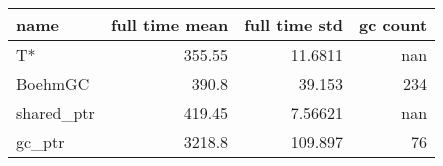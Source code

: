 \begin{tabular}{lrrr}
\hline
 name       &   full time mean &   full time std &   gc count \\
\hline
 T*         &           355.55 &        11.6811  &        nan \\
 BoehmGC    &           390.8  &        39.153   &        234 \\
 shared\_ptr &           419.45 &         7.56621 &        nan \\
 gc\_ptr     &          3218.8  &       109.897   &         76 \\
\hline
\end{tabular}